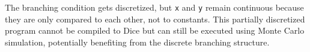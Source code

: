 \noindent The branching condition gets discretized, but \texttt{x} and \texttt{y} remain continuous because they are only compared to each other, not to constants. This partially discretized program cannot be compiled to Dice but can still be executed using Monte Carlo simulation, potentially benefiting from the discrete branching structure.









